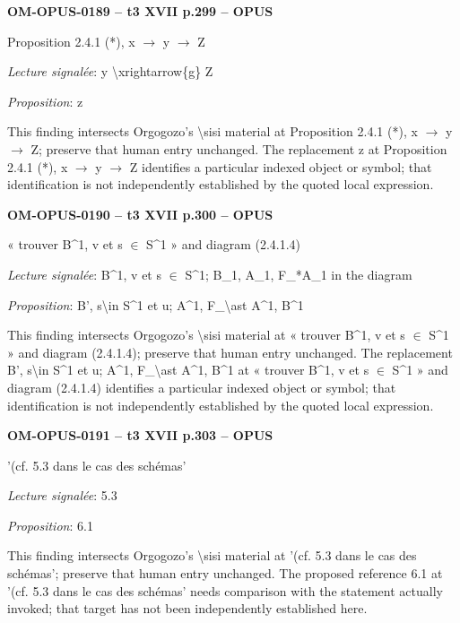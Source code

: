\par\noindent\textbf{OM-OPUS-0189 -- t3 XVII p.299 -- OPUS}\par
Proposition 2.4.1 (*), x \ensuremath{\to} y \ensuremath{\to} Z\par
\emph{Lecture signalée}: y \textbackslash{}xrightarrow\{g\} Z\par
\emph{Proposition}: z\par
This finding intersects Orgogozo's \textbackslash{}sisi material at Proposition 2.4.1 (*), x \ensuremath{\to} y \ensuremath{\to} Z; preserve that human entry unchanged. The replacement z at Proposition 2.4.1 (*), x \ensuremath{\to} y \ensuremath{\to} Z identifies a particular indexed object or symbol; that identification is not independently established by the quoted local expression.\par
\par\noindent\textbf{OM-OPUS-0190 -- t3 XVII p.300 -- OPUS}\par
« trouver B\textasciicircum{}1, v et s \ensuremath{\in} S\textasciicircum{}1 » and diagram (2.4.1.4)\par
\emph{Lecture signalée}: B\textasciicircum{}1, v et s \ensuremath{\in} S\textasciicircum{}1; B\_1, A\_1, F\_*A\_1 in the diagram\par
\emph{Proposition}: B', s\textbackslash{}in S\textasciicircum{}1 et u; A\textasciicircum{}1, F\_\textbackslash{}ast A\textasciicircum{}1, B\textasciicircum{}1\par
This finding intersects Orgogozo's \textbackslash{}sisi material at « trouver B\textasciicircum{}1, v et s \ensuremath{\in} S\textasciicircum{}1 » and diagram (2.4.1.4); preserve that human entry unchanged. The replacement B', s\textbackslash{}in S\textasciicircum{}1 et u; A\textasciicircum{}1, F\_\textbackslash{}ast A\textasciicircum{}1, B\textasciicircum{}1 at « trouver B\textasciicircum{}1, v et s \ensuremath{\in} S\textasciicircum{}1 » and diagram (2.4.1.4) identifies a particular indexed object or symbol; that identification is not independently established by the quoted local expression.\par
\par\noindent\textbf{OM-OPUS-0191 -- t3 XVII p.303 -- OPUS}\par
'(cf. 5.3 dans le cas des schémas'\par
\emph{Lecture signalée}: 5.3\par
\emph{Proposition}: 6.1\par
This finding intersects Orgogozo's \textbackslash{}sisi material at '(cf. 5.3 dans le cas des schémas'; preserve that human entry unchanged. The proposed reference 6.1 at '(cf. 5.3 dans le cas des schémas' needs comparison with the statement actually invoked; that target has not been independently established here.\par
